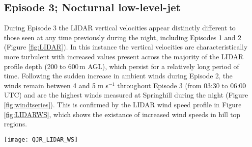 \documentclass[times]{qjrms4}
\begin{document}
%
%

\subsection{Episode 3; Nocturnal low-level-jet}
\label{ep3}
During Episode 3 the LIDAR vertical velocities appear distinctly different to those seen at any time previously during the night, including Episodes 1 and 2 (Figure \ref{fig:LIDAR}). In this instance the vertical velocities are characteristically more turbulent with increased values present across the majority of the LIDAR profile depth (200 to 600$\,\mbox{m}$ AGL), which  persist for a relatively long period of time. Following the sudden increase in ambient winds during Episode 2, the winds remain between 4 and 5 m s$^{-1}$ throughout Episode 3 (from 03:30 to 06:00 UTC) and are the highest winds measured at Springhill during the night (Figure \ref{fig:windtseries}). This is confirmed by the LIDAR wind speed profile in Figure \ref{fig:LIDARWS}, which shows the existance of increased wind speeds in hill top regions.
%
       \begin{figure*}
        \centering
        \texttt{[image: QJR\_LIDAR\_WS]}
        \caption{Time series of NCAS LIDAR measurements of wind speed taken at Duffryn. Dashed line indicates local hill tops.}
        \label{fig:LIDARWS}
        \end{figure*}
\end{document}
